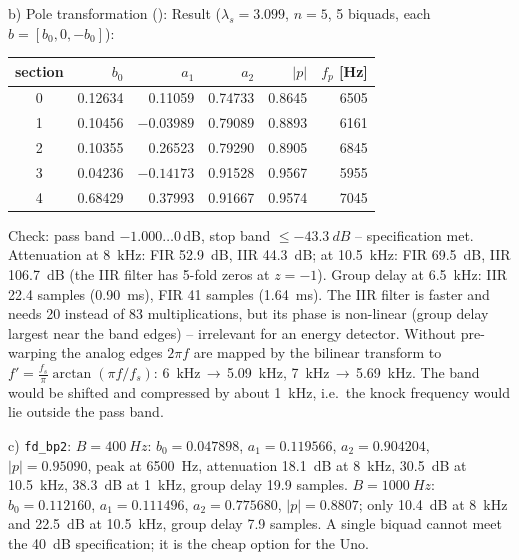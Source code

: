 \begin{solution}
b) Pole transformation ():
Result ($\lambda_s=3.099$, $n=5$, 5 biquads, each $b=[b_0,0,-b_0]$):
\begin{center}
\small
\begin{tabular}{@{}crrrrr@{}}
\toprule
section & $b_0$ & $a_1$ & $a_2$ & $|p|$ & $f_p$ [Hz]\\
\midrule
0 & 0.12634 & 0.11059 & 0.74733 & 0.8645 & 6505\\
1 & 0.10456 & $-0.03989$ & 0.79089 & 0.8893 & 6161\\
2 & 0.10355 & 0.26523 & 0.79290 & 0.8905 & 6845\\
3 & 0.04236 & $-0.14173$ & 0.91528 & 0.9567 & 5955\\
4 & 0.68429 & 0.37993 & 0.91667 & 0.9574 & 7045\\
\bottomrule
\end{tabular}
\end{center}
Check: pass band $-1.000\dots0$\,dB, stop band $\le\SI{-43.3}{dB}$ -- specification
met. Attenuation at \SI{8}{kHz}: FIR \SI{52.9}{dB}, IIR \SI{44.3}{dB}; at
\SI{10.5}{kHz}: FIR \SI{69.5}{dB}, IIR \SI{106.7}{dB} (the IIR filter has
5-fold zeros at $z=-1$). Group delay at \SI{6.5}{kHz}: IIR 22.4 samples
(\SI{0.90}{ms}), FIR 41 samples (\SI{1.64}{ms}). The IIR filter is faster and
needs 20 instead of 83 multiplications, but its phase is non-linear (group
delay largest near the band edges) -- irrelevant for an energy detector.
Without pre-warping the analog edges $2\pi f$ are mapped by the bilinear
transform to $f'=\tfrac{f_s}{\pi}\arctan(\pi f/f_s)$: \SI{6}{kHz}\,$\to$\,\SI{5.09}{kHz},
\SI{7}{kHz}\,$\to$\,\SI{5.69}{kHz}. The band would be shifted and compressed by
about \SI{1}{kHz}, i.e.\ the knock frequency would lie outside the pass band.

c) \texttt{fd\_bp2}: $B=\SI{400}{Hz}$: $b_0=0.047898$, $a_1=0.119566$,
$a_2=0.904204$, $|p|=0.95090$, peak at \SI{6500}{Hz}, attenuation
\SI{18.1}{dB} at \SI{8}{kHz}, \SI{30.5}{dB} at \SI{10.5}{kHz}, \SI{38.3}{dB}
at \SI{1}{kHz}, group delay 19.9 samples. $B=\SI{1000}{Hz}$: $b_0=0.112160$,
$a_1=0.111496$, $a_2=0.775680$, $|p|=0.8807$; only \SI{10.4}{dB} at \SI{8}{kHz}
and \SI{22.5}{dB} at \SI{10.5}{kHz}, group delay 7.9 samples. A single biquad
cannot meet the \SI{40}{dB} specification; it is the cheap option for the Uno.


\end{solution}
